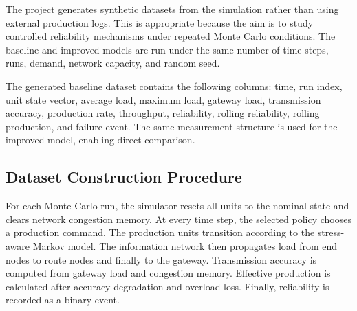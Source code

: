 \documentclass[journal]{IEEEtran}
\begin{document}
The project generates synthetic datasets from the simulation rather than using external production logs. This is appropriate because the aim is to study controlled reliability mechanisms under repeated Monte Carlo conditions. The baseline and improved models are run under the same number of time steps, runs, demand, network capacity, and random seed.

\begin{table}[H]
\centering
\caption{Main simulation parameters.}
\label{tab:params}
\end{table}

The generated baseline dataset contains the following columns: time, run index, unit state vector, average load, maximum load, gateway load, transmission accuracy, production rate, throughput, reliability, rolling reliability, rolling production, and failure event. The same measurement structure is used for the improved model, enabling direct comparison.

\subsection{Dataset Construction Procedure}

For each Monte Carlo run, the simulator resets all units to the nominal state and clears network congestion memory. At every time step, the selected policy chooses a production command. The production units transition according to the stress-aware Markov model. The information network then propagates load from end nodes to route nodes and finally to the gateway. Transmission accuracy is computed from gateway load and congestion memory. Effective production is calculated after accuracy degradation and overload loss. Finally, reliability is recorded as a binary event.
\end{document}
